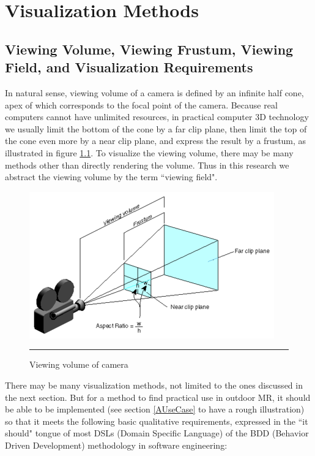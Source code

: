 \chapter{Visualization Methods}
\label{Chapter3}

\section{Viewing Volume, Viewing Frustum, Viewing Field, and Visualization Requirements}
\label{VisualizationRequirements}

In natural sense, viewing volume of a camera is defined by an infinite half cone, apex of which corresponds to the focal point of the camera. Because real computers cannot have unlimited resources, in practical computer 3D technology we usually limit the bottom of the cone by a far clip plane, then limit the top of the cone even more by a near clip plane, and express the result by a frustum, as illustrated in figure \ref{fig:ViewingVolume}. To visualize the viewing volume, there may be many methods other than directly rendering the volume. Thus in this research we abstract the viewing volume by the term ``viewing field".

\begin{figure}[htbp]
	\centering
	\includegraphics{./Primitives/viewing_volume.png}
	\rule{35em}{0.5pt}
	\caption[Viewing volume of camera]{Viewing volume of camera}
	\label{fig:ViewingVolume}
\end{figure}

There may be many visualization methods, not limited to the ones discussed in the next section. But for a method to find practical use in outdoor MR, it should be able to be implemented (see section \ref{AUseCase} to have a rough illustration) so that it meets the following basic qualitative requirements, expressed in the ``it should" tongue of most DSLs (Domain Specific Language) of the BDD (Behavior Driven Development) methodology in software engineering:

